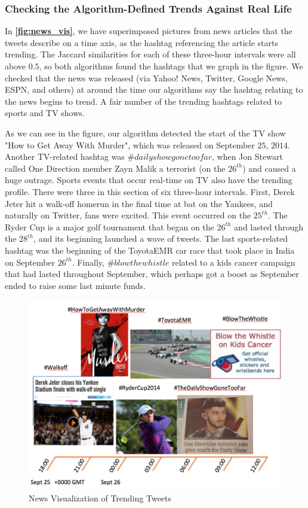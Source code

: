 \documentclass[twoside]{article}
\newcommand{\aref}[1]
 {\textbf{\autoref{#1}}}
\begin{document}
{\subsubsection{Checking the Algorithm-Defined Trends Against Real Life}

In \aref{fig:news_vis}, we have superimposed pictures from 
news articles that the tweets describe on a time axis, as
the hashtag referencing the article starts trending. The Jaccard similarities 
for each of these three-hour intervals were all above $0.5$, so both algorithms
found the hashtags that we graph in the figure.
We checked that the news was released (via Yahoo! News, Twitter, Google News, ESPN, and others)
at around the time our algorithms say the hashtag relating to the news
begins to trend. A fair number of the trending hashtags related to sports and TV shows. 

As we can see in the figure, our algorithm detected the start of the TV show "How to Get Away With Murder", which was released on September $25$, $2014$. Another TV-related hashtag was $\#dailyshowgonetoofar$, when Jon Stewart called One Direction member Zayn Malik a terrorist (on the $26^{th}$) and caused a huge outrage. Sports events that occur real-time on TV also have the trending profile. There were three in this section of six three-hour intervals. First, Derek Jeter hit a walk-off homerun in the final time at bat on the Yankees, and naturally on Twitter, fans were excited. This event occurred on the $25^{th}$. The Ryder Cup is a major golf tournament that began on the $26^{th}$ and lasted through the $28^{th}$, and its beginning launched a wave of tweets. The last sports-related hashtag was the beginning of the ToyotaEMR car race that took place in India on September $26^{th}$. Finally, $\#blowthewhistle$ related to a kids cancer campaign that had lasted throughout September, which perhaps got a boost as September ended to raise some last minute funds.

\begin{figure} 
\centering
\includegraphics[scale = .4]{Timeline}
\caption{News Visualization of Trending Tweets}
\label{fig:news_vis}
\end{figure}



}
\end{document}
